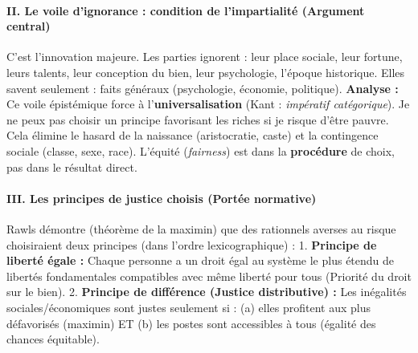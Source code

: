 \documentclass[11pt]{article}
\newcommand{\cle}[1]{{\popxbold\color{popdark}#1}}
\begin{document}
\begin{exoresolu}
    \paragraph{II. Le voile d'ignorance : condition de l'impartialité (Argument central)}
    C'est l'innovation majeure. Les parties ignorent : leur place sociale, leur fortune, leurs talents, leur conception du bien, leur psychologie, l'époque historique. Elles savent seulement : faits généraux (psychologie, économie, politique).
    \textbf{Analyse :} Ce voile épistémique force à l'\textbf{universalisation} (Kant : \emph{impératif catégorique}). Je ne peux pas choisir un principe favorisant les riches si je risque d'être pauvre. Cela élimine le \cle{hasard de la naissance} (aristocratie, caste) et la \cle{contingence sociale} (classe, sexe, race). L'équité (\emph{fairness}) est dans la \textbf{procédure} de choix, pas dans le résultat direct.
    \paragraph{III. Les principes de justice choisis (Portée normative)}
    Rawls démontre (théorème de la maximin) que des rationnels averses au risque choisiraient deux principes (dans l'ordre lexicographique) :
    1. \textbf{Principe de liberté égale :} Chaque personne a un droit égal au système le plus étendu de libertés fondamentales compatibles avec même liberté pour tous (Priorité du droit sur le bien).
    2. \textbf{Principe de différence (Justice distributive) :} Les inégalités sociales/économiques sont justes seulement si : (a) elles profitent aux plus défavorisés (maximin) ET (b) les postes sont accessibles à tous (égalité des chances équitable).

\end{exoresolu}
\end{document}
